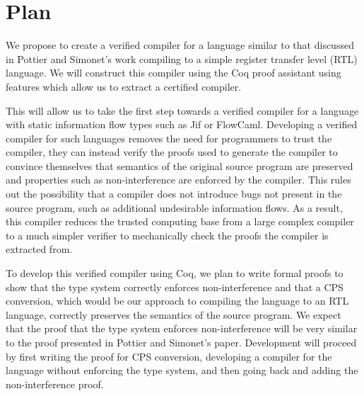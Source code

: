 \section{Plan}

We propose to create a verified compiler for a language similar to that
discussed in Pottier and Simonet's work\cite{InfoFlowML} compiling to a
simple register transfer level (RTL) language.  We will construct this
compiler using the Coq proof assistant\cite{coqart} using features which
allow us to extract a certified compiler.

This will allow us to take the first step towards a verified compiler
for a language with static information flow types such as
Jif\cite{myers1999jflow} or
FlowCaml\cite{simonet2003flow,simonet2003flowmanual}.  Developing a
verified compiler for such languages removes the need for programmers to
trust the compiler, they can instead verify the proofs used to generate
the compiler to convince themselves that semantics of the original
source program are preserved and properties such as non-interference are
enforced by the compiler.  This rules out the possibility that a
compiler does not introduce bugs not present in the source program, such
as additional undesirable information flows.  As a result, this compiler
reduces the trusted computing base from a large complex compiler to a
much simpler verifier to mechanically check the proofs the compiler is
extracted from.

To develop this verified compiler using Coq, we plan to write formal
proofs to show that the type system correctly enforces non-interference
and that a CPS conversion\cite{appel2007compiling}, which would be our
approach to compiling the language to an RTL language, correctly
preserves the semantics of the source program.  We expect that the proof
that the type system enforces non-interference will be very similar to
the proof presented in Pottier and Simonet's paper\cite{InfoFlowML}.
Development will proceed by first writing the proof for CPS conversion,
developing a compiler for the language without enforcing the type
system, and then going back and adding the non-interference proof.
